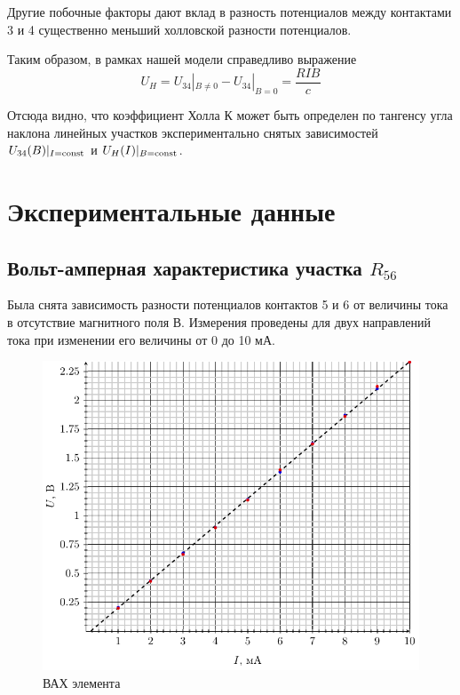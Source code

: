 Другие побочные факторы дают вклад в разность потенциалов между контактами 3 и 4 существенно меньший холловской разности потенциалов. 

Таким образом, в рамках нашей модели справедливо выражение
\begin{equation}
	U_H=U_{34}|_{B\ne 0}-U_{34}|_{B= 0}=\frac{RIB}{c}
\end{equation}

Отсюда видно, что коэффициент Холла $К$ может быть определен по тангенсу угла наклона линейных участков экспериментально снятых зависимостей $U_{34}(B)|_{I=\text{\rmfamily\upshape const}}$ и $U_H(I)|_{B=\text{\rmfamily\upshape const}}$.

\section{Экспериментальные данные}
\subsection{Вольт-амперная характеристика участка $R_{56}$}

Была снята зависимость разности потенциалов контактов 5 и 6 от
величины тока в отсутствие магнитного поля В. Измерения проведены для
двух направлений тока при изменении его величины от 0 до 10 мА. 

\begin{figure}[H]
	\centering
	\includegraphics[width=\textwidth]{img/vax}
	\caption{ВАХ элемента}
	\label{fig:vax}
\end{figure}

